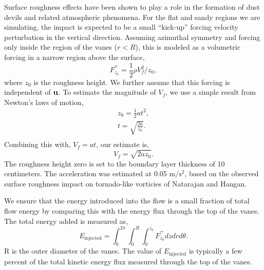 
Surface roughness effects have been shown to play a role in the
formation of dust devils and related atmospheric
phenomena\cite{oke1987boundary}. For the flat and sandy
regions we are simulating, the impact is expected to be a small
``kick-up'' forcing velocity perturbation in the vertical
direction. Assuming azimuthal symmetry and forcing only inside the
region of the vanes ($r<R$), this is modeled as a volumetric forcing in
a narrow region above the surface,  
\begin{equation}
 F^{'''}_{z_0} = \frac{1}{2}\rho V_f^2/z_{0}, 
\end{equation}
where $z_{0}$ is the roughness height. We further assume that this
forcing is independent of ${\bf u}$. To estimate the magnitude of
$V_f$, we use a simple result from Newton's laws of motion,
\begin{eqnarray}
z_0 = \frac{1}{2} a t^2, \\
t = \sqrt{\frac{2 a}{z_0}}. \\
\end{eqnarray}
Combining this with, $V_f = a t$, our estimate is, 
\begin{equation}
V_f = \sqrt{2 a z_0}.
\end{equation}
The roughness height zero is set to the boundary layer thickness of 10
centimeters. The acceleration was estimated at 0.05
$\text{m}/\text{s}^2$, based on the observed surface roughness impact on
tornado-like vorticies of Natarajan and Hangan\cite{Natarajan2012577}.  

We ensure that the energy
introduced into the flow is a small fraction of total flow energy by comparing
this with the energy flux through the top of the vanes. The total energy
added is measured as,  
\begin{equation}
 E_{\text{injected}} = \int_0^{2\pi} \int_0^R \int_0^{z_0} F^{'''}_{z_0}
  dz dr d\theta.  
\end{equation}
R is the outer diameter of the vanes. 
The value of $E_{\text{injected}}$ is typically a few percent of the
total kinetic energy flux measured through the top of the
vanes.

